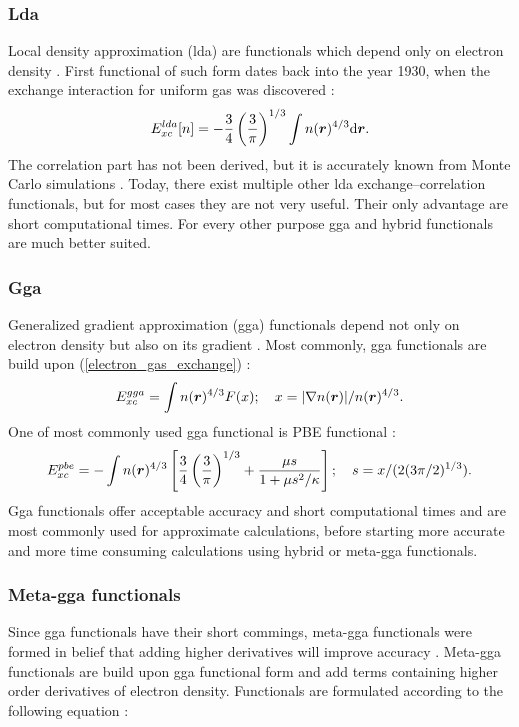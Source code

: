 \documentclass[openany, longbibliography,slovene,a4paper,12pt]{article}
\def\vec#1{\mbox{\boldmath$#1$}}
\newcommand{\dif}{\mathrm{d}}
\begin{document}
\subsubsection{Lda}
Local density approximation (lda) are functionals which depend only on
 electron density \cite{challenges_den_fun_theor, presc_desig_selec_densit_funct_approx}.
First functional of such form dates back into
the year 1930, when the exchange interaction for uniform gas was discovered
\cite{challenges_den_fun_theor} :
\begin{equation} \label{electron_gas_exchange}
E_{xc}^{lda}[n]=-\frac{3}{4}\left( \frac{3}{\pi} \right)^{1/3}\int n(\vec r)^{4/3} \dif \vec r.
\end{equation}
The correlation part has not been derived, but it is accurately known from Monte
Carlo simulations \cite{presc_desig_selec_densit_funct_approx}.
Today, there exist multiple other lda exchange--correlation functionals, but for most cases
they are not very useful. Their only advantage are short computational times.
For every other purpose gga and hybrid functionals are much better suited.

\subsubsection{Gga}
Generalized gradient approximation (gga) functionals
depend not only on electron density but also on its gradient
\cite{challenges_den_fun_theor}. Most commonly, gga functionals are build upon (\ref{electron_gas_exchange}) \cite{challenges_den_fun_theor}:
\begin{equation}
  E_{xc}^{gga}=\int n(\vec r)^{4/3}F(x);\quad x=|\nabla n(\vec r)|/n(\vec r)^{4/3}.
\end{equation}
One of most commonly used gga functional is PBE functional
\cite{challenges_den_fun_theor} \cite{challenges_den_fun_theor}:
\begin{equation}
  E_{xc}^{pbe}=-\int  n(\vec r)^{4/3}\left[ \frac{3}{4}\left(\frac{3}{\pi}\right)^{1/3} + \frac{\mu s}{1+ \mu s^2/\kappa} \right]; \quad s=x/(2(3\pi/2)^{1/3}).
\end{equation}
Gga functionals offer acceptable accuracy and short computational times and are
most commonly used for approximate calculations, before starting more accurate
and more time consuming calculations using hybrid or meta-gga functionals.

\subsubsection{Meta-gga functionals}
Since gga functionals have their short commings, meta-gga functionals were formed
in belief that adding higher derivatives will improve accuracy
\cite{challenges_den_fun_theor}. Meta-gga functionals are build upon gga
functional form and add terms containing higher order derivatives of electron
density. Functionals are formulated according to the following equation
\cite{challenges_den_fun_theor}:
\end{document}
